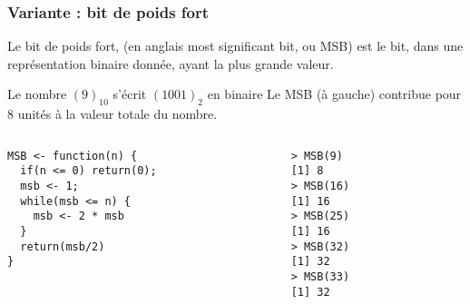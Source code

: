 \documentclass[10pt]{beamer}
\begin{document}
\begin{frame}[fragile]
  \frametitle{Variante : bit de poids fort}
  Le bit de poids fort, (en anglais \alert{most significant bit}, ou MSB) est le bit, dans une représentation binaire donnée, ayant la plus grande valeur.

  \begin{exampleblock}{Le nombre $(9)_{10}$ s'écrit $(1001)_2$ en binaire}
    Le MSB (à gauche) contribue pour 8 unités à la valeur totale du nombre.
  \end{exampleblock}


\begin{columns}[t]
\begin{column}{0.62\textwidth}
\begin{lstlisting}[style=editor]
MSB <- function(n) {
  if(n <= 0) return(0);
  msb <- 1;
  while(msb <= n) {
    msb <- 2 * msb
  }
  return(msb/2)
}  
\end{lstlisting}
\end{column}
\begin{column}{0.38\textwidth}
  \begin{lstlisting}
> MSB(9)
[1] 8
> MSB(16)
[1] 16
> MSB(25)
[1] 16
> MSB(32)
[1] 32
> MSB(33)
[1] 32
\end{lstlisting}
\end{column}
\end{columns}
\end{frame}
\end{document}
